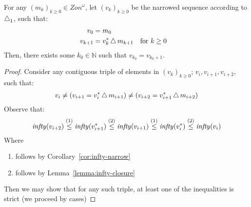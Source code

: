 \begin{prop}
  For any $(m_k)_{k\geq0}\in\mathit{Zon}^\omega$, let $(v_k)_{k\geq0}$ be the narrowed sequence according to $\operatorname{\triangle}_1$, such that:
  \begin{align*}
    v_0 & = m_0
    \\ v_{k+1} & = v_k^\ast\operatorname{\triangle} m_{k+1} && \text{for } k\geq0
  \end{align*}
  Then, there exists some $k_0\in\mathbb{N}$ such that $v_{k_0} = v_{k_0+1}$.

  \begin{proof}
    Consider any contiguous triple of elements in $(v_k)_{k\geq0}$; $v_i,v_{i+1},v_{i+2}$, such that:
    \begin{align*}
      v_i\neq(v_{i+1} = v_i^\ast\operatorname{\triangle} m_{i+1})\neq(v_{i+2} = v_{i+1}^\ast\operatorname{\triangle} m_{i+2})
    \end{align*}
    Observe that:
    \begin{align*}
      \operatorname{\mathit{infty}}(v_{i+2})
      \overset{\text{(1)}}\leq\operatorname{\mathit{infty}}(v_{i+1}^\ast)
      \overset{\text{(2)}}\leq\operatorname{\mathit{infty}}(v_{i+1})
      \overset{\text{(1)}}\leq\operatorname{\mathit{infty}}(v_i^\ast)
      \overset{\text{(2)}}\leq\operatorname{\mathit{infty}}(v_i)
    \end{align*}
    Where
    \begin{enumerate}[(1)]
      \item follows by Corollary~\ref{cor:infty-narrow}
      \item follows by Lemma~\ref{lemma:infty-closure}
    \end{enumerate}

    Then we may show that for any such triple, at least one of the inequalities is strict (we proceed by cases)


\end{proof}
\end{prop}
